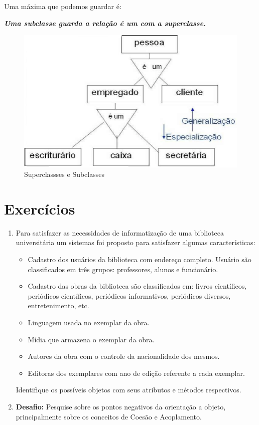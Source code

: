 Uma máxima que podemos guardar é: 

\begin{center}
\textbf{\textit{Uma subclasse guarda a relação é um com a superclasse.}}    
\end{center}

\begin{figure}[H]
  \centering
  \includegraphics[scale=0.5]{imagens/sub-e-sup-classes.png}
  \caption{Superclassses e Subclasses}
  \label{fig:sub-e-sup-classes}
\end{figure}

\section{Exercícios}

\begin{enumerate}
    \item Para satisfazer as necessidades de informatização de uma biblioteca 
universitária um sistemas foi proposto para satisfazer algumas características:

\begin{itemize}
  \item Cadastro dos usuários da biblioteca com endereço completo. 
  Usuário são classificados em três grupos: professores, alunos e funcionário.  
  \item Cadastro das obras da biblioteca são classificados em: livros científicos, periódicos científicos, periódicos informativos, periódicos diversos, entretenimento, etc.
  \item Linguagem usada no exemplar da obra.
  \item Mídia que armazena o exemplar da obra.
  \item Autores da obra com o controle da nacionalidade dos mesmos.
  \item Editoras dos exemplares com ano de edição referente a cada exemplar.
\end{itemize}

Identifique os possíveis objetos com seus atributos e métodos respectivos.

\item \textbf{Desafio:} Pesquise sobre os pontos negativos da orientação a objeto, principalmente sobre os conceitos de Coesão e Acoplamento.
\end{enumerate}

